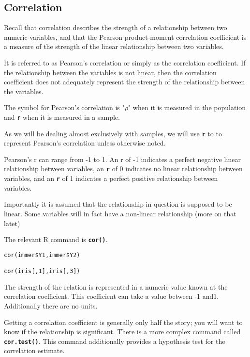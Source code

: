 \subsection{Correlation}
Recall that correlation describes the strength of a relationship between two numeric variables, and that the Pearson product-moment correlation coefficient is a measure of the strength of the linear relationship between two variables.

It is referred to as Pearson's correlation or simply as the correlation coefficient. If the relationship between the variables is not linear, then the correlation coefficient does not adequately represent the strength of the relationship between the variables.

The symbol for Pearson's correlation is "$\rho$" when it is measured in the population and \texttt{\textbf{r}} when it is measured in a sample.

As we will be dealing almost exclusively with samples, we will use \texttt{\textbf{r}} to to represent Pearson's correlation unless otherwise noted.

Pearson's r can range from -1 to 1. An r of -1 indicates a perfect negative linear relationship between variables, an \texttt{\textbf{r}} of 0 indicates no linear relationship between variables, and an \texttt{\textbf{r}} of 1 indicates a perfect positive relationship between variables.

Importantly it is assumed that the relationship in question is supposed to be linear. Some variables will in fact have a non-linear relationship (more on that latet)

The relevant R command is \texttt{\textbf{cor()}}.


\begin{framed}
\begin{verbatim}
cor(immer$Y1,immer$Y2)

cor(iris[,1],iris[,3])
\end{verbatim}
\end{framed}
The strength of the relation is represented in a numeric value known at the correlation coefficient. This coefficient can take a value between -1 and1. Additionally there are no units.

Getting a correlation coefficient is generally only half the story; you will want to know if the relationship is significant. There is a more complex command called \texttt{\textbf{cor.test()}}. This command additionally provides a hypothesis test for the correlation estimate.

